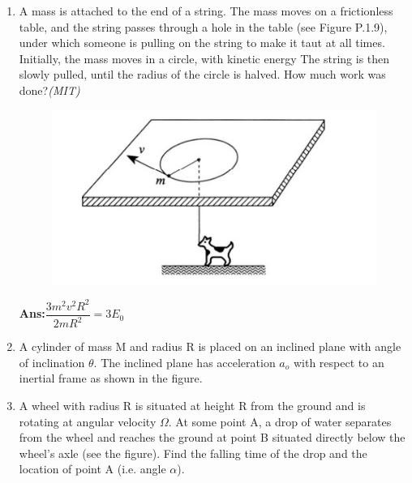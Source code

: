 \begin{enumerate}
\item A mass is attached to the end of a string. The mass moves on a frictionless table, and the string passes through a hole in the table (see Figure
P.1.9), under which someone is pulling on the string to make it taut at all
times. Initially, the mass moves in a circle, with kinetic energy The
string is then slowly pulled, until the radius of the circle is halved. How much work was done?\hfill \textsl{(MIT)}
\begin{figure}[htp]
    \centering
    \includegraphics{mainmatter/kinem3.PNG}
    \label{fig:my_label}
\end{figure}
\textbf{Ans:}$\dfrac{3m^2v^2R^2}{2mR^2} = 3E_0$
\item A cylinder of mass M and radius R is placed on an inclined plane with angle of inclination $\theta$. The 
inclined plane has acceleration $a_o$ with respect to an inertial frame as shown in the figure.

\item A wheel with radius R is situated at height R from
the ground and is rotating at angular velocity $\Omega$. At some point A, a drop of water separates from the wheel and reaches the ground at point B situated directly below the wheel’s axle (see the figure). Find the falling time of the drop and the location of point A (i.e. angle $\alpha$).

\end{enumerate}



